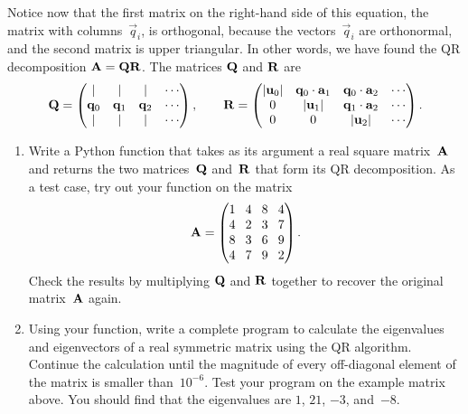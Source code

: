\documentclass[12pt]{article}
\begin{document}
\begin{exercises}
Notice now that the first matrix on the right-hand side of this equation,
the matrix with columns~$\vec{q}_i$, is orthogonal, because the
vectors~$\vec{q}_i$ are orthonormal, and the second matrix is upper
triangular.  In other words, we have found the QR decomposition
$\mathbf{A}=\mathbf{Q}\mathbf{R}$.  The matrices $\mathbf{Q}$ and $\mathbf{R}$ are
\begin{displaymath}
\mathbf{Q} =
\begin{pmatrix}
  | & | & | & \cdots \\
  \mathbf{q}_0 & \mathbf{q}_1 & \mathbf{q}_2 & \cdots \\
  | & | & | & \cdots
\end{pmatrix}
,\qquad
\mathbf{R} =
\begin{pmatrix}
|\mathbf{u}_0| & \mathbf{q}_0\cdot\mathbf{a}_1 & \mathbf{q}_0\cdot\mathbf{a}_2 & \cdots \\
0           & |\mathbf{u}_1| & \mathbf{q}_1\cdot\mathbf{a}_2 & \cdots \\
0           & 0           & |\mathbf{u}_2| & \cdots
\end{pmatrix}.
\end{displaymath}
\begin{enumerate}\setlength{\itemsep}{0pt}
\setcounter{enumi}{1}
\item Write a Python function that takes as its argument a real square
  matrix~$\mathbf{A}$ and returns the two matrices~$\mathbf{Q}$ and~$\mathbf{R}$
  that form its QR decomposition.  As a test case, try out your function on
  the matrix
\begin{displaymath}
\setlength{\arraycolsep}{4pt}
\mat{A} = \begin{pmatrix}
            1 & 4 & 8 & 4 \\
            4 & 2 & 3 & 7 \\
            8 & 3 & 6 & 9 \\
            4 & 7 & 9 & 2
          \end{pmatrix}.
\end{displaymath}
Check the results by multiplying $\mathbf{Q}$ and $\mathbf{R}$ together to
recover the original matrix~$\mathbf{A}$ again.
\item Using your function, write a complete program to calculate the
  eigenvalues and eigenvectors of a real symmetric matrix using the QR
  algorithm.  Continue the calculation until the magnitude of every
  off-diagonal element of the matrix is smaller than~$10^{-6}$.  Test your
  program on the example matrix above.  You should find that the
  eigenvalues are $1$, $21$, $-3$, and~$-8$.
\end{enumerate}



\end{exercises}
\end{document}
